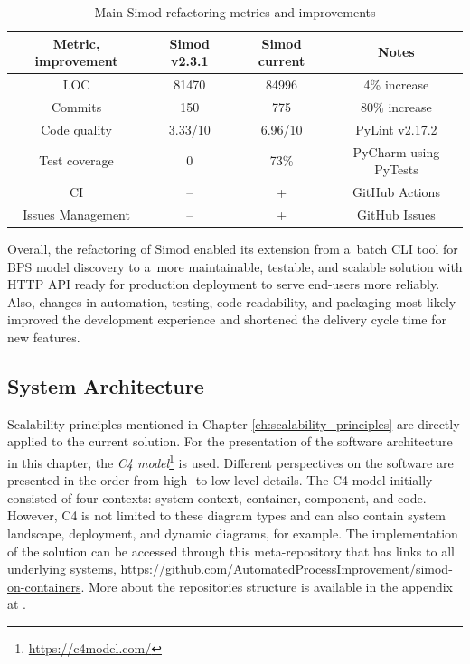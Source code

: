 \documentclass[12pt]{article}
\begin{document}
\begin{table}[t]
    \footnotesize
    \centering
    \begin{tabular}{|c|c|c|c|}
        \hline
        \textbf{Metric, improvement} & \textbf{Simod v2.3.1} & \textbf{Simod current} & \textbf{Notes} \\
        \hline \hline
        LOC & 81470 & 84996 & 4\% increase \\
        Commits & 150 & 775 & 80\% increase \\
        Code quality & 3.33/10 & 6.96/10 & PyLint v2.17.2 \\
        Test coverage & 0 & 73\% & PyCharm using PyTests \\
        CI & -- & + & GitHub Actions \\
        Issues Management & -- & + & GitHub Issues \\
        \hline
    \end{tabular}
    \caption{Main Simod refactoring metrics and improvements}
    \label{tab:simod_maintenance}
\end{table}

Overall, the refactoring of Simod enabled its extension from a~batch CLI tool for BPS model discovery to a~more maintainable, testable, and scalable solution with HTTP API ready for production deployment to serve end-users more reliably. Also, changes in automation, testing, code readability, and packaging most likely improved the development experience and shortened the delivery cycle time for new features.

\subsection{System Architecture} \label{ch:architecture}

Scalability principles mentioned in Chapter \ref{ch:scalability_principles} are directly applied to the current solution. For the presentation of the software architecture in this chapter, the \emph{C4 model}\footnote{\href{https://c4model.com/}{https://c4model.com/}} is used. Different perspectives on the software are presented in the order from high- to low-level details. The C4 model initially consisted of four contexts: system context, container, component, and code. However, C4 is not limited to these diagram types and can also contain system landscape, deployment, and dynamic diagrams, for example. The implementation of the solution can be accessed through this meta-repository that has links to all underlying systems, \href{https://github.com/AutomatedProcessImprovement/simod-on-containers}{https://github.com/AutomatedProcessImprovement/simod-on-containers}. More about the repositories structure is available in the appendix at .
\end{document}
